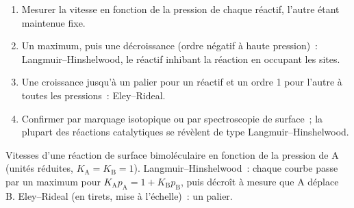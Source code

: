 \begin{method}\label{met:b3:surfaces-catalysis:mechanism-from-rate}
\begin{enumerate}
  \item Mesurer la vitesse en fonction de la pression de chaque réactif,
        l'autre étant maintenue fixe.
  \item Un maximum, puis une décroissance (ordre négatif à haute
        pression)~: Langmuir--Hinshelwood, le réactif inhibant la
        réaction en occupant les sites.
  \item Une croissance jusqu'à un palier pour un réactif et un ordre 1
        pour l'autre à toutes les pressions~: Eley--Rideal.
  \item Confirmer par marquage isotopique ou par spectroscopie de
        surface~; la plupart des réactions catalytiques se révèlent de
        type Langmuir--Hinshelwood.
\end{enumerate}
\end{method}

\begin{omfigure}

{\small Vitesses d'une réaction de surface bimoléculaire en fonction de la
pression de A (unités réduites, $K_{\mathrm A} = K_{\mathrm B} = 1$).
Langmuir--Hinshelwood~: chaque courbe passe par un maximum pour
$K_{\mathrm A}p_{\mathrm A} =
1 + K_{\mathrm B}p_{\mathrm B}$, puis décroît à mesure que A déplace B.
Eley--Rideal (en tirets, mise à l'échelle)~: un palier.}
\end{omfigure}

